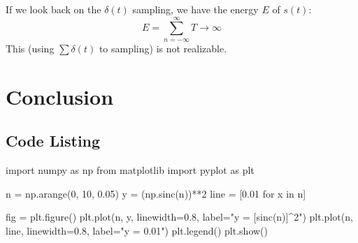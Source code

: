 \documentclass{article}
\begin{document}
If we look back on the $\delta(t)$ sampling, we have the energy $E$ of $s(t)$:
\begin{equation}
E = \sum_{n = -\infty}^{\infty} T \to \infty
\label{eq:impulseEnergy}
\end{equation}
This (using $\sum \delta(t)$ to sampling) is not realizable.

\section{Conclusion}
    \subsubsection*{}
    \subsubsection*{}




\begin{appendices}
\section{Code Listing}
\begin{python}
    import numpy as np
    from matplotlib import pyplot as plt

    n = np.arange(0, 10, 0.05)
    y = (np.sinc(n))**2
    line = [0.01 for x in n]

    fig = plt.figure()
    plt.plot(n, y, linewidth=0.8, label="y = [sinc(n)]^2")
    plt.plot(n, line, linewidth=0.8, label="y = 0.01")
    plt.legend()
    plt.show()
\end{python}

\end{appendices}
\end{document}
